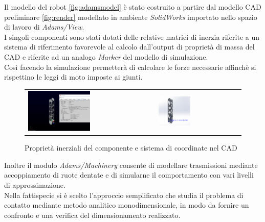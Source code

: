 \documentclass[%
corpo=11pt,
twoside,
 stile=classica,
oldstyle,
greek,%
]{toptesi}
\begin{document}
	Il modello del robot \ref{fig:adamsmodel} è stato costruito a partire dal modello CAD preliminare \ref{fig:render} modellato in ambiente \textit{SolidWorks} importato nello spazio di lavoro di \textit{Adams/View}.\\
	 I singoli componenti sono stati dotati delle relative matrici di inerzia riferite a un sistema di riferimento favorevole al calcolo dall'output di proprietà di massa del CAD e riferite ad un analogo \textit{Marker} del modello di simulazione. \\
	 Così facendo la simulazione permetterà di calcolare le forze necessarie affinchè si rispettino le leggi di moto imposte ai giunti.
			\begin{figure}
			\centering
			\begin{tabular} {ll}
		
			\includegraphics[width=0.5\textwidth]{Screen/inertia.png}
			&
			\includegraphics[width=0.4\textwidth]{Screen/coordinate.png}
			\end{tabular}
			\caption{Proprietà inerziali del componente e sistema di coordinate nel CAD}
			\label{fig:inertia}
			\end{figure}
	 Inoltre il modulo \textit{Adams/Machinery} consente di modellare trasmissioni mediante accoppiamento di ruote dentate e di simularne il comportamento con vari livelli di approssimazione. \\
	 Nella fattispecie si è scelto l'approccio semplificato che studia il problema di contatto mediante metodo analitico monodimensionale, in modo da fornire un confronto e una verifica del dimensionamento realizzato. 	
\end{document}
